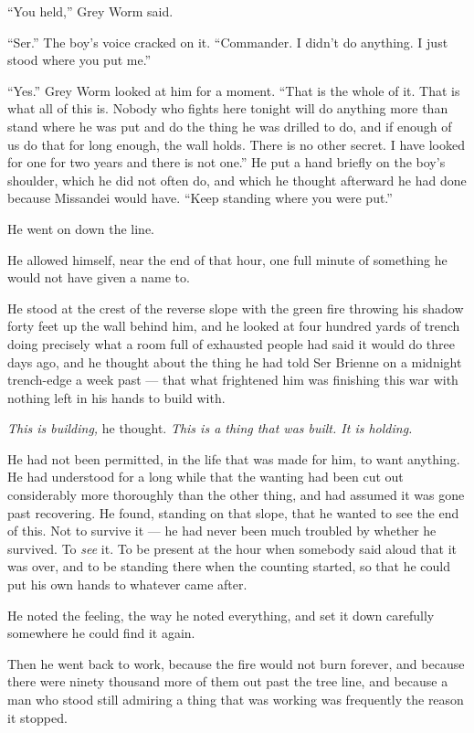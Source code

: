 “You held,” Grey Worm said.

“Ser.” The boy’s voice cracked on it. “Commander. I didn’t do anything. I just stood where you put me.”

“Yes.” Grey Worm looked at him for a moment. “That is the whole of it. That is what all of this is. Nobody who fights here tonight will do anything more than stand where he was put and do the thing he was drilled to do, and if enough of us do that for long enough, the wall holds. There is no other secret. I have looked for one for two years and there is not one.” He put a hand briefly on the boy’s shoulder, which he did not often do, and which he thought afterward he had done because Missandei would have. “Keep standing where you were put.”

He went on down the line.

\sceneBreak

He allowed himself, near the end of that hour, one full minute of something he would not have given a name to.

He stood at the crest of the reverse slope with the green fire throwing his shadow forty feet up the wall behind him, and he looked at four hundred yards of trench doing precisely what a room full of exhausted people had said it would do three days ago, and he thought about the thing he had told Ser Brienne on a midnight trench-edge a week past — that what frightened him was finishing this war with nothing left in his hands to build with.

\textit{This is building,} he thought. \textit{This is a thing that was built. It is holding.}

He had not been permitted, in the life that was made for him, to want anything. He had understood for a long while that the wanting had been cut out considerably more thoroughly than the other thing, and had assumed it was gone past recovering. He found, standing on that slope, that he wanted to see the end of this. Not to survive it — he had never been much troubled by whether he survived. To \textit{see} it. To be present at the hour when somebody said aloud that it was over, and to be standing there when the counting started, so that he could put his own hands to whatever came after.

He noted the feeling, the way he noted everything, and set it down carefully somewhere he could find it again.

Then he went back to work, because the fire would not burn forever, and because there were ninety thousand more of them out past the tree line, and because a man who stood still admiring a thing that was working was frequently the reason it stopped.

